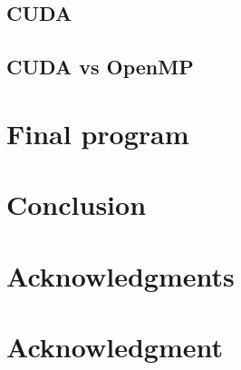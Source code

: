 \documentclass[conference,compsoc]{IEEEtran}
\begin{document}
\subsection{CUDA}\label{sec:CUDA}

\subsection{CUDA vs OpenMP}


\section{Final program}



\section{Conclusion}

\ifCLASSOPTIONcompsoc
  \section*{Acknowledgments}
\else
  \section*{Acknowledgment}
\fi

\newpage
{}


\end{document}
